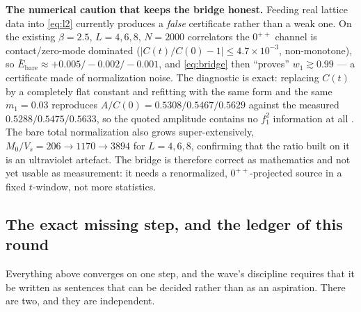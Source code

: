 \textbf{The numerical caution that keeps the bridge honest.} Feeding real lattice data into
\eqref{eq:l2} currently produces a \emph{false} certificate rather than a weak one. On the existing
$\beta=2.5$, $L=4,6,8$, $N=2000$ correlators the $0^{++}$ channel is contact/zero-mode dominated
($|C(t)/C(0)-1|\le4.7\times10^{-3}$, non-monotone), so $\bar E_{\mathrm{bare}}\approx+0.005/
-0.002/-0.001$, and \eqref{eq:bridge} then ``proves'' $w_1\gtrsim0.99$ --- a certificate made of
normalization noise. The diagnostic is exact: replacing $C(t)$ by a completely flat constant and
refitting with the same form and the same $m_1=0.03$ reproduces $A/C(0)=0.5308/0.5467/0.5629$
against the measured $0.5288/0.5475/0.5633$, so the quoted amplitude contains no $f_1^2$
information at all \LE. The bare total normalization also grows super-extensively,
$M_0/V_s=206\to1170\to3894$ for $L=4,6,8$, confirming that the ratio built on it is an ultraviolet
artefact. The bridge is therefore correct as mathematics and not yet usable as measurement: it needs
a renormalized, $0^{++}$-projected source in a fixed $t$-window, not more statistics.

\subsection{The exact missing step, and the ledger of this round}

Everything above converges on one step, and the wave's discipline requires that it be written as
sentences that can be decided rather than as an aspiration. There are two, and they are independent.

